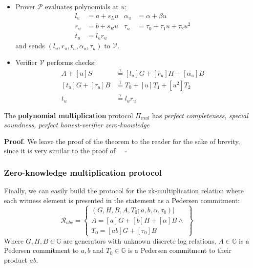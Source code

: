 \documentclass[../../book.tex]{subfiles}
\begin{document}
\begin{definition}
\begin{itemize}
\begin{itemize}
                \item Prover $\mathcal{P}$ evaluates polynomials at $u$:
                    \begin{equation}
                        \begin{aligned}
                            l_u & = a + s_L u & \alpha_u &= \alpha + \beta u\\
                            r_u &= b + s_R u & \tau_u &= \tau_0 + \tau_1 u + \tau_2 u^2\\
                            t_u &= l_u r_u & 
                        \end{aligned}
                    \end{equation}
                    and sends $(l_u, r_u, t_u, \alpha_u, \tau_u)$ to $\mathcal{V}$.
                \item Verifier $\mathcal{V}$ performs checks: 
                    \begin{equation}
                        \begin{aligned}
                            A + [u]S &\stackrel{\text{?}}{=} [l_u]G + [r_u]H + [\alpha_u]B \\
                            [t_u]G + [\tau_u]B &\stackrel{\text{?}}{=} T_0 + [u]T_1 + [u^2]T_2 \\
                            t_u &\stackrel{\text{?}}{=} l_u r_u
                        \end{aligned}
                    \end{equation}
            \end{itemize}
    \end{itemize}
\end{definition}

\begin{theorem}
    The \textbf{polynomial multiplication} protocol $\Pi_{mul}$ has \textit{perfect completeness, special soundness, perfect honest-verifier zero-knowledge}
    \label{th:poly_mul}
\end{theorem}
\textbf{Proof}. We leave the proof of the theorem to the reader for the sake of brevity, since it is very similar to the proof of  $\quad \square$

\subsubsection{Zero-knowledge multiplication protocol}

Finally, we can easily build the protocol for the zk-multiplication relation where each witness element is presented in the statement as a Pedersen commitment:
$$\mathcal{R}_{abc} = \left\{\begin{array}{l}
    (G,H,B,A,T_0;a,b, \alpha, \tau_0) \vert \\
    A = [a]G + [b]H + [\alpha]B \wedge \\
    T_0 = [ab]G + [\tau_0]B 
\end{array}\right\}$$
Where $G,H,B \in \mathbb{G}$ are generators with unknown discrete log relations, $A \in \mathbb{G}$ is a Pedersen commitment to $a,b$ and $T_0 \in \mathbb{G}$ is a Pedersen commitment to their product $ab$.
\end{document}
